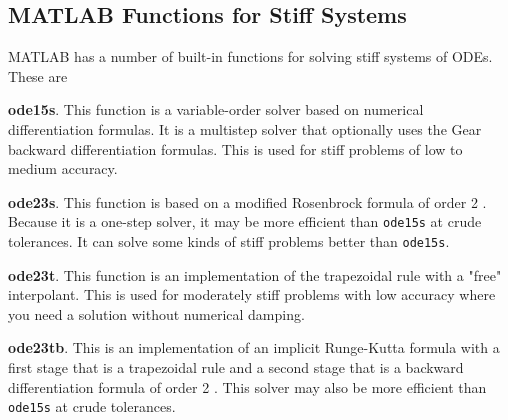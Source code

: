 \documentclass[../main.tex]{subfiles}
\begin{document}
\subsection{MATLAB Functions for Stiff Systems}

\noindent MATLAB has a number of built-in functions for solving stiff systems of ODEs. These are
\vspace{1mm}

\noindent \textbf{ode15s}. This function is a variable-order solver based on numerical differentiation formulas. It is a multistep solver that optionally uses the Gear backward differentiation formulas. This is used for stiff problems of low to medium accuracy.
\vspace{1mm}

\noindent \textbf{ode23s}. This function is based on a modified Rosenbrock formula of order 2 . Because it is a one-step solver, it may be more efficient than \texttt{ode15s} at crude tolerances. It can solve some kinds of stiff problems better than \texttt{ode15s}.
\vspace{1mm}

\noindent \textbf{ode23t}. This function is an implementation of the trapezoidal rule with a "free" interpolant. This is used for moderately stiff problems with low accuracy where you need a solution without numerical damping.
\vspace{1mm}

\noindent \textbf{ode23tb}. This is an implementation of an implicit Runge-Kutta formula with a first stage that is a trapezoidal rule and a second stage that is a backward differentiation formula of order 2 . This solver may also be more efficient than \texttt{ode15s} at crude tolerances.
\end{document}
